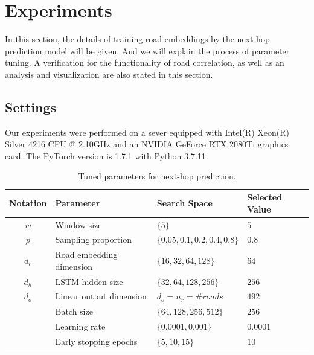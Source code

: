 
\section{Experiments}
In this section, the details of training road embeddings by the next-hop prediction model will be given. And we will explain the process of parameter tuning. A verification for the functionality of road correlation, as well as an analysis and visualization are also stated in this section.

\subsection{Settings}
Our experiments were performed on a sever equipped with Intel(R) Xeon(R) Silver 4216 CPU @ 2.10GHz and an NVIDIA GeForce RTX 2080Ti graphics card. The PyTorch\cite{pytorch} version is 1.7.1 with Python 3.7.11.

\begin{table}[htb]
    \begin{center}
        \caption{Tuned parameters for next-hop prediction.}
        \label{next-hop_params}
        \begin{tabular}{clll}
            \toprule
  
            \textbf{Notation} & \textbf{Parameter} & \textbf{Search Space} & \textbf{Selected Value}\\
  
            \midrule
  
            $w$ & Window size & $\{5 \}$ & $5$\\
            $p$ & Sampling proportion & $\{0.05, 0.1, 0.2, 0.4, 0.8\}$ & $0.8$\\
            $d_r$ & Road embedding dimension & $\{16, 32, 64, 128 \}$ & $64$\\
            $d_h$ & LSTM hidden size & $\{32, 64, 128, 256 \}$ & $256$\\
            $d_o$ & Linear output dimension & $d_o=n_r=\#roads$ & $492$\\
            ~ & Batch size & $\{64, 128, 256, 512 \}$ & $256$\\
            ~ & Learning rate & $\{0.0001, 0.001\}$ & $0.0001$\\
            ~ & Early stopping epochs & $\{5, 10, 15\}$ & $10$\\
  
            \bottomrule
        \end{tabular}
    \end{center}
\end{table}

